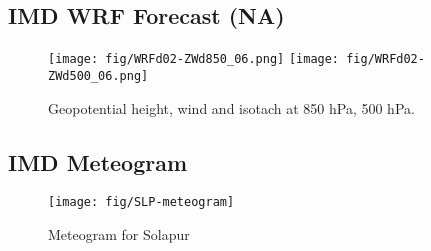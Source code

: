 \documentclass[12pt,a4paper]{article} %
\begin{document}


\subsection*{IMD WRF Forecast (NA)}

\begin{figure}[H]
\centering
\texttt{[image: fig/WRFd02-ZWd850\_06.png]}
\texttt{[image: fig/WRFd02-ZWd500\_06.png]}
\caption{Geopotential height, wind and isotach at 850 hPa, 500 hPa.}
\end{figure}







%




\subsection*{IMD Meteogram}
\begin{figure}[H]
\centering
\texttt{[image: fig/SLP-meteogram]}
\caption{Meteogram for Solapur}
\end{figure}
\end{document}
